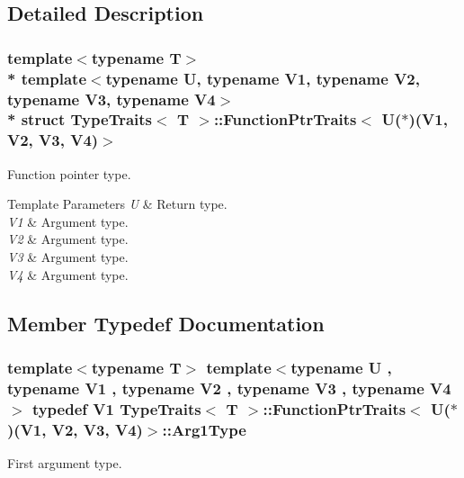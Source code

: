 \subsection{Detailed Description}
\subsubsection*{template$<$typename T$>$\\*
template$<$typename U, typename V1, typename V2, typename V3, typename V4$>$\\*
struct Type\+Traits$<$ T $>$\+::\+Function\+Ptr\+Traits$<$ U($\ast$)(\+V1, V2, V3, V4)$>$}

Function pointer type. 
\begin{DoxyTemplParams}{Template Parameters}
{\em U} & Return type. \\
\hline
{\em V1} & Argument type. \\
\hline
{\em V2} & Argument type. \\
\hline
{\em V3} & Argument type. \\
\hline
{\em V4} & Argument type. \\
\hline
\end{DoxyTemplParams}


\subsection{Member Typedef Documentation}
\subsubsection[{\texorpdfstring{Arg1\+Type}{Arg1Type}}]{\setlength{\rightskip}{0pt plus 5cm}template$<$typename T$>$ template$<$typename U , typename V1 , typename V2 , typename V3 , typename V4 $>$ typedef V1 {\bf Type\+Traits}$<$ T $>$\+::{\bf Function\+Ptr\+Traits}$<$ U($\ast$)(V1, V2, V3, V4)$>$\+::{\bf Arg1\+Type}}\hypertarget{structTypeTraits_1_1FunctionPtrTraits_3_01U_07_5_08_07V1_00_01V2_00_01V3_00_01V4_08_4_afc704987a2afcac70ae484a886c97469}{}\label{structTypeTraits_1_1FunctionPtrTraits_3_01U_07_5_08_07V1_00_01V2_00_01V3_00_01V4_08_4_afc704987a2afcac70ae484a886c97469}
First argument type. 

